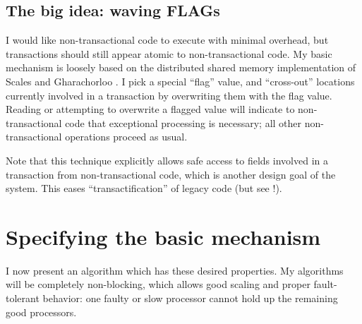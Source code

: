 \subsection{The big idea: waving FLAGs}\label{sec:flagfield}

I would like non-transactional code to execute with minimal overhead,
but transactions should still appear atomic to non-transactional
code.  My basic mechanism is loosely based on the
distributed shared memory implementation of Scales and Gharachorloo
\cite{ScalesGh97}.  I pick a special ``flag'' value, and
``cross-out'' locations currently involved in a transaction by
overwriting them with the flag value.  Reading or attempting to
overwrite a flagged value will indicate to non-transactional code
that exceptional processing is necessary; all other non-transactional
operations proceed as usual.

Note that this technique explicitly allows safe access to fields
involved in a transaction from non-transactional code, which is
another design goal of the system.  This eases ``transactification''
of legacy code (but see !).

\section{Specifying the basic mechanism}
I now present an algorithm which has these desired properties.
My algorithms will be completely non-blocking, which allows good
scaling and proper fault-tolerant behavior: one faulty or slow
processor cannot hold up the remaining good processors.

